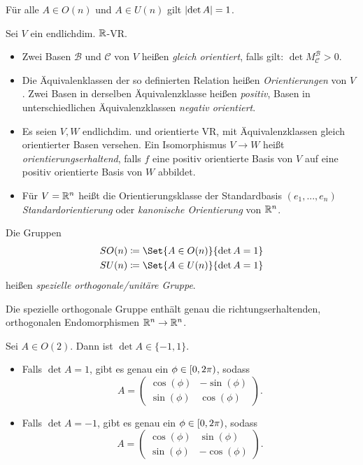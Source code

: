 \documentclass{cheat-sheet}
\newcommand{\BB}{\mathcal{B}}
\newcommand{\BC}{\mathcal{C}}
\begin{document}
\begin{bem}
  Für alle $A \in O(n)$ und $A \in U(n)$ gilt $\lvert\det A\rvert = 1$.
\end{bem}

\begin{defn}
  Sei $V$ ein endlichdim. $\mathbb{R}$-VR.
  \begin{itemize}
    \item Zwei Basen $\BB$ und $\BC$ von $V$ heißen \emph{gleich orientiert}, falls gilt: $\det M_{\BC}^{\BB} > 0$.
    \item Die Äquivalenklassen der so definierten Relation heißen \emph{Orientierungen} von $V$. Zwei Basen in derselben Äquivalenzklasse heißen \emph{positiv}, Basen in unterschiedlichen Äquivalenzklassen \emph{negativ orientiert}.
    \item Es seien $V, W$ endlichdim. und orientierte VR, \dh{} mit Äquivalenzklassen gleich orientierter Basen versehen. Ein Isomorphismus $V \to W$ heißt \emph{orientierungserhaltend}, falls $f$ eine positiv orientierte Basis von $V$ auf eine positiv orientierte Basis von $W$ abbildet.
    \item Für $V = \mathbb{R}^n$ heißt die Orientierungsklasse der Standardbasis $(e_1, ..., e_n)$ \emph{Standardorientierung} oder \emph{kanonische Orientierung} von $\mathbb{R}^n$.
  \end{itemize}
\end{defn}

\begin{defn}
  Die Gruppen
  \begin{align*}
  SO(n) \coloneqq \Set{ A \in O(n) }{ \det A = 1 } \\
  SU(n) \coloneqq \Set{ A \in U(n) }{ \det A = 1 }
  \end{align*}
  heißen \emph{spezielle orthogonale/unitäre Gruppe}.
\end{defn}

\begin{bem}
  Die spezielle orthogonale Gruppe enthält genau die richtungserhaltenden, orthogonalen Endomorphismen $\mathbb{R}^n \to \mathbb{R}^n$.
\end{bem}

\begin{satz}
  Sei $A \in O(2)$. Dann ist $\det A \in \{ -1, 1 \}$.
  \begin{itemize}
    \item Falls $\det A = 1$, gibt es genau ein $\phi \in \left[ 0, 2 \pi \right)$, sodass
    \[ A = \begin{pmatrix} \cos(\phi) & - \sin(\phi) \\ \sin(\phi) & \cos(\phi) \end{pmatrix}. \]
    \item Falls $\det A = -1$, gibt es genau ein $\phi \in \left[ 0, 2 \pi \right)$, sodass
    \[ A = \begin{pmatrix} \cos(\phi) & \sin(\phi) \\ \sin(\phi) & - \cos(\phi) \end{pmatrix}. \]
  \end{itemize}
\end{satz}
\end{document}
